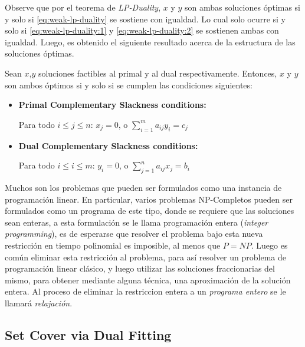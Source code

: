 \documentclass[../np-approximations.tex]{subfiles}
\begin{document}
Observe que por el teorema de \emph{LP-Duality}, $x$ y $y$ son ambas soluciones óptimas si y solo si \eqref{eq:weak-lp-duality} se sostiene con igualdad. Lo cual solo ocurre si y solo si \eqref{eq:weak-lp-duality:1} y \eqref{eq:weak-lp-duality:2} se sostienen ambas con igualdad. Luego, es obtenido el siguiente resultado acerca de la estructura de las soluciones óptimas.

\begin{theorem}
	Sean $x$,$y$ soluciones factibles al primal y al dual respectivamente. Entonces, $x$ y $y$ son ambos óptimos si y solo si se cumplen las condiciones siguientes:
	\begin{itemize}
		\item \textbf{Primal Complementary Slackness conditions:}
		      		      		      		      		      		      		      		      		      		      		
		      Para todo $i\le j\le n$: $x_j=0$, o
		      $\sum_{i=1}^m a_{ij}y_i = c_j$
		\item \textbf{Dual Complementary Slackness conditions:}
		      		      		      		      		      		      		      		      		      			
		      Para todo $i\le i\le m$: $y_i=0$, o
		      $\sum_{j=1}^n a_{ij}x_j = b_i$
	\end{itemize}
\end{theorem}

Muchos son los problemas que pueden ser formulados como una instancia de programación linear. En particular, varios problemas NP-Completos pueden ser formulados como un programa de este tipo, donde se requiere que las soluciones sean enteras, a esta formulación se le llama programación entera (\emph{integer programming}), es de esperarse que resolver el problema bajo esta nueva restricción en tiempo polinomial es imposible, al menos que $P=NP$. Luego es común eliminar esta restricción al problema, para así resolver un problema de programación linear clásico, y luego utilizar las soluciones fraccionarias del mismo, para obtener mediante alguna técnica, una aproximación de la solución entera. Al proceso de eliminar la restriccion entera a un \emph{programa entero} se le llamará \emph{relajación}.

\subsection{Set Cover via Dual Fitting}
\end{document}
